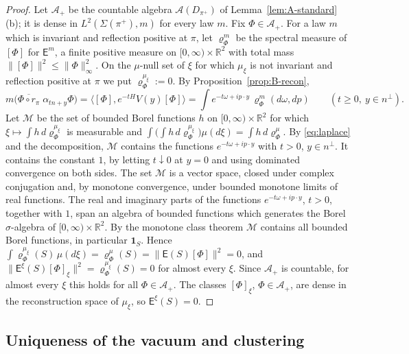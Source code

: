 \documentclass[11pt]{amsart}
\theoremstyle{plain}
\theoremstyle{definition}
\theoremstyle{remark}
\numberwithin{equation}{section}
\newcommand{\R}{\mathbb{R}}
\newcommand{\cA}{\mathcal{A}}
\newcommand{\norm}[1]{\lVert #1\rVert}
\newcommand{\ip}[2]{\langle #1,#2\rangle}
\begin{document}
\begin{proof}
Let $\cA_+$ be the countable algebra $\cA(D_{\pi^+})$ of Lemma~\ref{lem:A-standard}(b); it is dense in $L^2(\Sigma(\pi^+),m)$ for every law $m$. Fix $\Phi\in\cA_+$. For a law $m$ which is invariant and reflection positive at $\pi$, let $\varrho^m_\Phi$ be the spectral measure of $[\Phi]$ for $\mathsf E^m$, a finite positive measure on $[0,\infty)\times\R^2$ with total mass $\norm{[\Phi]}^2\le\norm\Phi_\infty^2$. On the $\mu$-null set of $\xi$ for which $\mu_\xi$ is not invariant and reflection positive at $\pi$ we put $\varrho^{\mu_\xi}_\Phi:=0$. By Proposition~\ref{prop:B-recon},
\begin{equation}\label{eq:laplace}
m\big(\overline{\Phi\circ r_\pi}\;\alpha_{tn+y}\Phi\big)=\ip{[\Phi]}{e^{-tH}V(y)[\Phi]}=\int e^{-t\omega+ip\cdot y}\,\varrho^m_\Phi(d\omega,dp)\qquad(t\ge0,\ y\in n^\perp).
\end{equation}
Let $\mathcal M$ be the set of bounded Borel functions $h$ on $[0,\infty)\times\R^2$ for which $\xi\mapsto\int h\,d\varrho^{\mu_\xi}_\Phi$ is measurable and $\int\big(\int h\,d\varrho^{\mu_\xi}_\Phi\big)\mu(d\xi)=\int h\,d\varrho^\mu_\Phi$. By \eqref{eq:laplace} and the decomposition, $\mathcal M$ contains the functions $e^{-t\omega+ip\cdot y}$ with $t>0$, $y\in n^\perp$. It contains the constant $1$, by letting $t\downarrow0$ at $y=0$ and using dominated convergence on both sides. The set $\mathcal M$ is a vector space, closed under complex conjugation and, by monotone convergence, under bounded monotone limits of real functions. The real and imaginary parts of the functions $e^{-t\omega+ip\cdot y}$, $t>0$, together with $1$, span an algebra of bounded functions which generates the Borel $\sigma$-algebra of $[0,\infty)\times\R^2$. By the monotone class theorem $\mathcal M$ contains all bounded Borel functions, in particular $\mathbf 1_S$. Hence $\int\varrho^{\mu_\xi}_\Phi(S)\,\mu(d\xi)=\varrho^\mu_\Phi(S)=\norm{\mathsf E(S)[\Phi]}^2=0$, and $\norm{\mathsf E^\xi(S)[\Phi]_\xi}^2=\varrho^{\mu_\xi}_\Phi(S)=0$ for almost every $\xi$. Since $\cA_+$ is countable, for almost every $\xi$ this holds for all $\Phi\in\cA_+$. The classes $[\Phi]_\xi$, $\Phi\in\cA_+$, are dense in the reconstruction space of $\mu_\xi$, so $\mathsf E^\xi(S)=0$.
\end{proof}

\subsection{Uniqueness of the vacuum and clustering}
\end{document}
